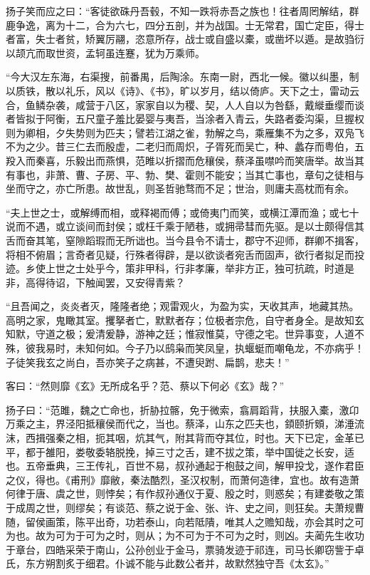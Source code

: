 \documentclass[12pt,UTF8]{ctexbook}
\begin{document}
扬子笑而应之曰：“客徒欲硃丹吾毂，不知一跌将赤吾之族也！往者周罔解结，群鹿争逸，离为十二，合为六七，四分五剖，并为战国。士无常君，国亡定臣，得士者富，失士者贫，矫翼厉翮，恣意所存，战士或自盛以橐，或凿坏以遁。是故驺衍以颉亢而取世资，孟轲虽连蹇，犹为万乘师。



“今大汉左东海，右渠搜，前番禺，后陶涂。东南一尉，西北一候。徽以纠墨，制以质铁，散以礼乐，风以《诗》、《书》，旷以岁月，结以倚庐。天下之士，雷动云合，鱼鳞杂袭，咸营于八区，家家自以为稷、契，人人自以为咎繇，戴縰垂缨而谈者皆拟于阿衡，五尺童子羞比晏婴与夷吾，当涂者入青云，失路者委沟渠，旦握权则为卿相，夕失势则为匹夫；譬若江湖之雀，勃解之鸟，乘雁集不为之多，双凫飞不为之少。昔三仁去而殷虚，二老归而周炽，子胥死而吴亡，种、蠡存而粤伯，五羖入而秦喜，乐毅出而燕惧，范睢以折摺而危穰侯，蔡泽虽噤吟而笑唐举。故当其有事也，非萧、曹、子房、平、勃、樊、霍则不能安；当其亡事也，章句之徒相与坐而守之，亦亡所患。故世乱，则圣哲驰骛而不足；世治，则庸夫高枕而有余。



“夫上世之士，或解缚而相，或释褐而傅；或倚夷门而笑，或横江潭而渔；或七十说而不遇，或立谈间而封侯；或枉千乘于陋巷，或拥帚彗而先驱。是以士颇得信其舌而奋其笔，窒隙蹈瑕而无所诎也。当今县令不请士，郡守不迎师，群卿不揖客，将相不俯眉；言奇者见疑，行殊者得辟，是以欲谈者宛舌而固声，欲行者拟足而投迹。乡使上世之士处乎今，策非甲科，行非孝廉，举非方正，独可抗疏，时道是非，高得待诏，下触闻罢，又安得青紫？



“且吾闻之，炎炎者灭，隆隆者绝；观雷观火，为盈为实，天收其声，地藏其热。高明之家，鬼瞰其室。攫拏者亡，默默者存；位极者宗危，自守者身全。是故知玄知默，守道之极；爰清爰静，游神之廷；惟寂惟莫，守德之宅。世异事变，人道不殊，彼我易时，未知何如。今子乃以鸱枭而笑凤皇，执蝘蜓而嘲龟龙，不亦病乎！子徒笑我玄之尚白，吾亦笑子之病甚，不遭臾跗、扁鹊，悲夫！”



客曰：“然则靡《玄》无所成名乎？范、蔡以下何必《玄》哉？”



扬子曰：“范雎，魏之亡命也，折胁拉髂，免于微索，翕肩蹈背，扶服入橐，激卬万乘之主，界泾阳抵穰侯而代之，当也。蔡泽，山东之匹夫也，顉颐折頞，涕涶流沫，西揖强秦之相，扼其咽，炕其气，附其背而夺其位，时也。天下已定，金革已平，都于雒阳，娄敬委辂脱挽，掉三寸之舌，建不拔之策，举中国徙之长安，适也。五帝垂典，三王传礼，百世不易，叔孙通起于枹鼓之间，解甲投戈，遂作君臣之仪，得也。《甫刑》靡敝，秦法酷烈，圣汉权制，而萧何造律，宜也。故有造萧何律于唐、虞之世，则悖矣；有作叔孙通仪于夏、殷之时，则惑矣；有建娄敬之策于成周之世，则缪矣；有谈范、蔡之说于金、张、许、史之间，则狂矣。夫萧规曹随，留侯画策，陈平出奇，功若泰山，向若阺隤，唯其人之赡知哉，亦会其时之可为也。故为可为于可为之时，则从；为不可为于不可为之时，则凶。夫蔺先生收功于章台，四皓采荣于南山，公孙创业于金马，票骑发迹于祁连，司马长卿窃訾于卓氏，东方朔割炙于细君。仆诚不能与此数公者并，故默然独守吾《太玄》。”
\end{document}
